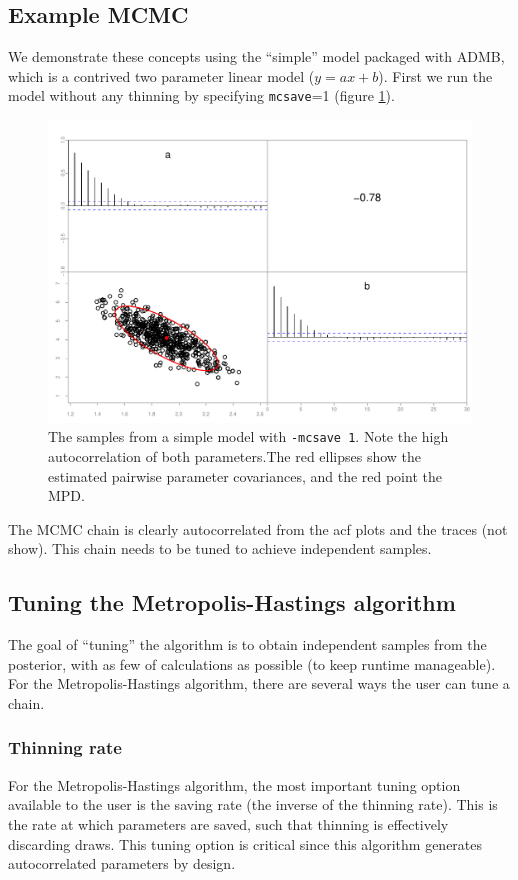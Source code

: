 \documentclass{article}\usepackage[]{graphicx}\usepackage[]{color}
\begin{document}
\subsection{Example MCMC}
We demonstrate these concepts using the ``simple'' model
packaged with ADMB, which is a contrived two parameter
linear model ($y=ax+b$). First we run the model without any
thinning by specifying \texttt{mcsave}=1 (figure
\ref{fig:simple1}).
\begin{figure}[h]
  \centering
  \includegraphics[width=5in]{../plots/simple1.pdf}
  \caption{The samples from a simple model with
    \texttt{-mcsave 1}. Note the high autocorrelation of
    both parameters.The red ellipses show the estimated
    pairwise parameter covariances, and the red point the
    MPD.}
  \label{fig:simple1}
\end{figure}
The MCMC chain is clearly autocorrelated from the acf plots
and the traces (not show). This chain needs to be tuned to
achieve independent samples.
\subsection{Tuning the Metropolis-Hastings algorithm}\label{sec:MHtuning}
The goal of ``tuning'' the algorithm is to obtain
independent samples from the posterior, with as few of
calculations as possible (to keep runtime manageable). For
the Metropolis-Hastings algorithm, there are several ways the user can tune a chain.

\subsubsection{Thinning rate}
For the Metropolis-Hastings algorithm, the most important tuning option
available to the user is the saving rate (the inverse of the
thinning rate). This is the rate at which parameters are
saved, such that thinning is effectively discarding
draws. This tuning option is critical since this algorithm
generates autocorrelated parameters by design.
\end{document}
